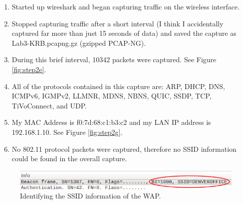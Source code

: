 \documentclass{article}
\begin{document}
\begin{enumerate}
\begin{enumerate}
        \item \label{2c} Started up wireshark and began capturing traffic on the wireless interface.
        \item \label{2d} Stopped capturing traffic after a short interval (I think I accidentally
              captured far more than just 15 seconds of data) and saved the capture as
              Lab3-KRB.pcapng.gz (gzipped PCAP-NG).
        \item \label{2e} During this brief interval, 10342 packets were captured. See Figure
              \ref{fig:step2e}.
        \item \label{2f} All of the protocols contained in this capture are: ARP, DHCP, DNS, ICMPv6,
              IGMPv2, LLMNR, MDNS, NBNS, QUIC, SSDP, TCP, TiVoConnect, and UDP.
        \item \label{2g} My MAC Address is f0:7d:68:c1:b3:c2 and my LAN IP address is 192.168.1.10. See
              Figure \ref{fig:step2g}.
        \item \label{2h} No 802.11 protocol packets were captured, therefore no SSID information could be
              found in the overall capture.

    \end{enumerate}
\end{enumerate}

\begin{figure}
\begin{mdframed}
\includegraphics[scale=0.5]{Step_1a.png}
\caption{Identifying the SSID information of the WAP.}
\label{fig:step1a}
\end{mdframed}
\end{figure}
\end{document}
